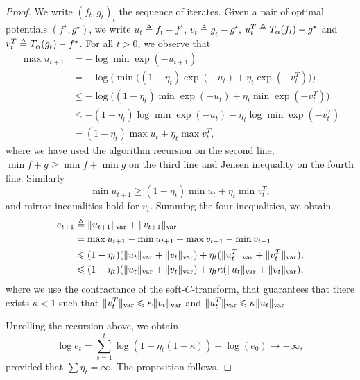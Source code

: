 \begin{proof}
    We write ${(f_t, g_t)}_t$ the sequence of iterates. Given a pair of optimal potentials 
    $(f^\star, g^\star)$, we write $u_t \triangleq f_t - f^\star$, $v_t \triangleq g_t - g^\star$,
    $u_t^T \triangleq T_{\alpha}(f_t) - g^\star$ and $v_t^T \triangleq T_{\alpha}(g_t) - f^\star$.
    For all $t > 0$, we observe that 
    \begin{align}
        \max u_{t+1} &= - \log \min \exp(-u_{t+1}) \\
        &= - \log \big( \min \big( (1 - \eta_t) \exp(-u_{t}) + \eta_t 
        \exp(-v_t^T) \big) \big)\\
        &\leq - \log \big( (1 - \eta_t) \min \exp(-u_{t}) + \eta_t 
        \min \exp(-v_t^T) \big)\\
        &\leq - (1 - \eta_t) \log \min \exp(-u_{t}) -  \eta_t \log \min
         \exp(-v_t^T) \\
         &= (1 - \eta_t) \max u_t  + \eta_t \max v_t^T,
    \end{align}
    where we have used the algorithm recursion on the second line, $\min f + g \geq \min f + \min g$
     on the third line and Jensen inequality on the fourth line. Similarly
    \begin{equation}
        \min u_{t+1} \geq (1 - \eta_t) \min u_t  + \eta_t \min v_t^T,
    \end{equation}
    and mirror inequalities hold for $v_t$. Summing the four inequalities, we obtain
    \begin{align}\label{eq:et}
        e_{t+1} &\triangleq \Vert u_{t+1} \Vert_{\text{\upshape var}} + \Vert v_{t+1} \Vert_{\text{\upshape var}} \\ 
        &= \max u_{t+1} - \min u_{t+1} + \max v_{t+1} - \min v_{t+1} \\
        &\leqslant
        (1 - \eta_t) ( \Vert u_t \Vert_{\text{\upshape var}} + \Vert v_t \Vert_{\text{\upshape var}})
        + \eta_t ( \Vert u_t^T \Vert_{\text{\upshape var}} + \Vert v_t^T \Vert_{\text{\upshape var}}), \\
        &\leqslant
        (1 - \eta_t) ( \Vert u_t \Vert_{\text{\upshape var}} + \Vert v_t \Vert_{\text{\upshape var}})
        + \eta_t \kappa ( \Vert u_t \Vert_{\text{\upshape var}} + \Vert v_t \Vert_{\text{\upshape var}}),
    \end{align}
    where we use the contractance of the soft-$C$-transform, that guarantees that
    there exists $\kappa < 1$ such that $\Vert v_t^T\Vert_{\text{\upshape var}} \leqslant \kappa \Vert
    v_t\Vert_{\text{\upshape var}}$ and $\Vert u_t^T\Vert_{\text{\upshape var}} \leqslant \kappa \Vert
    u_t\Vert_{\text{\upshape var}}$ \citep{peyre2019computational}.

    Unrolling the recursion above, we obtain
    \begin{equation}
        \log e_t = \sum_{s=1}^t \log(1 - \eta_t (1 - \kappa)) + \log(e_0) \to - \infty,
    \end{equation}
    provided that $\sum \eta_t = \infty$. The proposition follows.
\end{proof}


